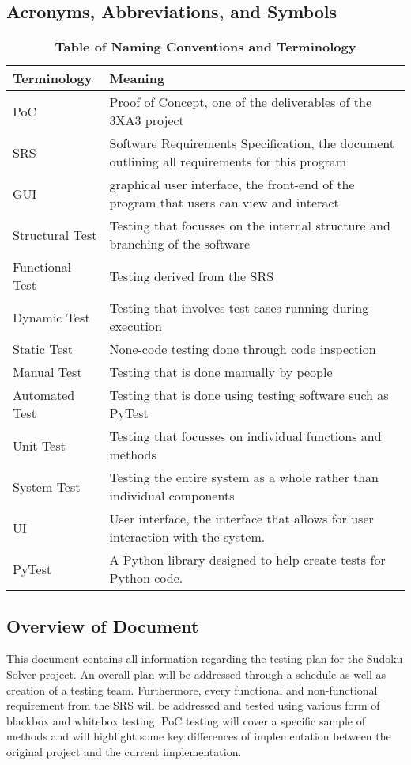 \documentclass[11pt]{article}
\begin{document}
\subsection{Acronyms, Abbreviations, and Symbols}
\begin{table}[H]
\caption{\bf Table of Naming Conventions and Terminology} \label{Table}
\centering
\begin{tabularx}{\textwidth}{p{3cm}X}
\toprule
Terminology     & Meaning \\
\midrule
PoC & Proof of Concept, one of the deliverables of the 3XA3 project\\
SRS & Software Requirements Specification, the document outlining all requirements for this program\\
GUI & graphical user interface, the front-end of the program that users can view and interact\\
Structural Test & Testing that focusses on the internal structure and branching of the software\\
Functional Test & Testing derived from the SRS\\
Dynamic Test & Testing that involves test cases running during execution\\
Static Test & None-code testing done through code inspection\\
Manual Test & Testing that is done manually by people\\
Automated Test & Testing that is done using testing software such as PyTest\\
Unit Test & Testing that focusses on individual functions and methods\\
System Test & Testing the entire system as a whole rather than individual components\\
UI     & User interface, the interface that allows for user interaction with the system. \\
PyTest & A Python library designed to help create tests for Python code. \\
\bottomrule
\end{tabularx}
\end{table}

\subsection{Overview of Document}
This document contains all information regarding the testing plan for the Sudoku Solver project. An overall plan will be addressed through a schedule as well as creation of a testing team. Furthermore, every functional and non-functional requirement from the SRS will be addressed and tested using various form of blackbox and whitebox testing. PoC testing will cover a specific sample of methods and will highlight some key differences of implementation between the original project and the current implementation.
\end{document}
